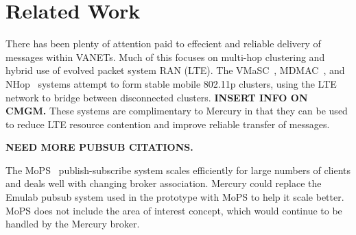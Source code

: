 \section*{Related Work}

There has been plenty of attention paid to effecient and reliable
delivery of messages within VANETs.  Much of this focuses on multi-hop
clustering and hybrid use of evolved packet system RAN (LTE).  The
VMaSC~\cite{ucar2016multihop}, MDMAC~\cite{wolny2008modified}, and
NHop~\cite{zhang2011novel} systems attempt to form stable mobile 802.11p
clusters, using the LTE network to bridge between disconnected
clusters. {\bf INSERT INFO ON CMGM.}  These systems are complimentary
to Mercury in that they can be used to reduce LTE resource contention
and improve reliable transfer of messages.

{\bf NEED MORE PUBSUB CITATIONS.}

The MoPS~\cite{nasim2014mobile} publish-subscribe system scales
efficiently for large numbers of clients and deals well with changing
broker association.  Mercury could replace the Emulab pubsub system
used in the prototype with MoPS to help it scale better. MoPS does not
include the area of interest concept, which would continue to be
handled by the Mercury broker.
